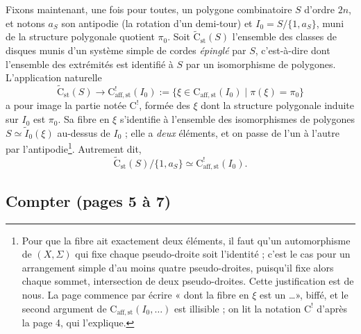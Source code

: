\documentclass[11pt,a4paper]{article}
\begin{document}
Fixons maintenant, une fois pour toutes, un polygone combinatoire $S$
d'ordre $2n$, et notons $a_S$ son antipodie (la rotation d'un demi-tour) et
$I_0 = S/\{1, a_S\}$, muni de la structure polygonale quotient $\pi_0$. Soit
$\widetilde{\mathrm{C}}_{\mathrm{st}}(S)$ l'ensemble des classes de disques
munis d'un système simple de cordes \emph{épinglé} par $S$, c'est-à-dire
dont l'ensemble des extrémités est identifié à $S$ par un isomorphisme de
polygones. L'application naturelle
\[
\widetilde{\mathrm{C}}_{\mathrm{st}}(S) \longrightarrow
\mathrm{C}^{!}_{\mathrm{aff,st}}(I_0) := \{\xi \in
\mathrm{C}_{\mathrm{aff,st}}(I_0) \mid \pi(\xi) = \pi_0\}
\]
a pour image la partie notée $\mathrm{C}^{!}$, formée des $\xi$ dont la
structure polygonale induite sur $I_0$ est $\pi_0$. Sa fibre en $\xi$
s'identifie à l'ensemble des isomorphismes de polygones $S \simeq
\widetilde{I}_0(\xi)$ au-dessus de $I_0$ ; elle a \emph{deux} éléments, et
on passe de l'un à l'autre par l'antipodie\footnote{Pour que la fibre ait
exactement deux éléments, il faut qu'un automorphisme de $(X, \Sigma)$ qui
fixe chaque pseudo-droite soit l'identité ; c'est le cas pour un arrangement
simple d'au moins quatre pseudo-droites, puisqu'il fixe alors chaque sommet,
intersection de deux pseudo-droites. Cette justification est de nous. La
page commence par écrire « dont la fibre en $\xi$ est un \ldots », biffé, et
le second argument de $\mathrm{C}_{\mathrm{aff,st}}(I_0, \ldots)$ est
illisible ; on lit la notation $\mathrm{C}^{!}$ d'après la page 4, qui
l'explique.}. Autrement dit,
\[
\widetilde{\mathrm{C}}_{\mathrm{st}}(S)/\{1, a_S\} \simeq
\mathrm{C}^{!}_{\mathrm{aff,st}}(I_0).
\]

\subsection*{Compter (pages 5 à 7)}
\end{document}
